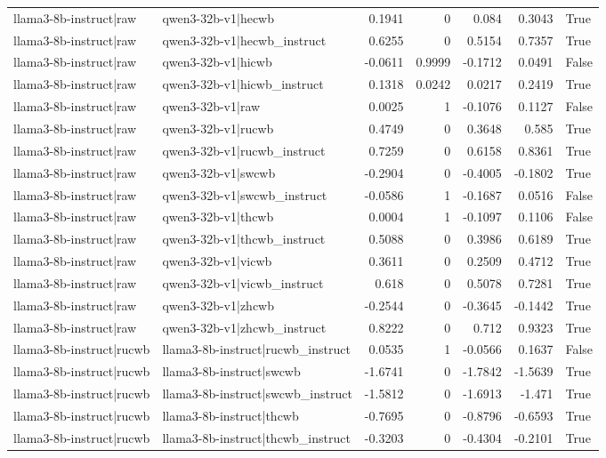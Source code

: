 \begin{table}
\begin{tabular}{l l r r r r l}
llama3-8b-instruct|raw & qwen3-32b-v1|hecwb & 0.1941 & 0 & 0.084 & 0.3043 & True \\
llama3-8b-instruct|raw & qwen3-32b-v1|hecwb_instruct & 0.6255 & 0 & 0.5154 & 0.7357 & True \\
llama3-8b-instruct|raw & qwen3-32b-v1|hicwb & -0.0611 & 0.9999 & -0.1712 & 0.0491 & False \\
llama3-8b-instruct|raw & qwen3-32b-v1|hicwb_instruct & 0.1318 & 0.0242 & 0.0217 & 0.2419 & True \\
llama3-8b-instruct|raw & qwen3-32b-v1|raw & 0.0025 & 1 & -0.1076 & 0.1127 & False \\
llama3-8b-instruct|raw & qwen3-32b-v1|rucwb & 0.4749 & 0 & 0.3648 & 0.585 & True \\
llama3-8b-instruct|raw & qwen3-32b-v1|rucwb_instruct & 0.7259 & 0 & 0.6158 & 0.8361 & True \\
llama3-8b-instruct|raw & qwen3-32b-v1|swcwb & -0.2904 & 0 & -0.4005 & -0.1802 & True \\
llama3-8b-instruct|raw & qwen3-32b-v1|swcwb_instruct & -0.0586 & 1 & -0.1687 & 0.0516 & False \\
llama3-8b-instruct|raw & qwen3-32b-v1|thcwb & 0.0004 & 1 & -0.1097 & 0.1106 & False \\
llama3-8b-instruct|raw & qwen3-32b-v1|thcwb_instruct & 0.5088 & 0 & 0.3986 & 0.6189 & True \\
llama3-8b-instruct|raw & qwen3-32b-v1|vicwb & 0.3611 & 0 & 0.2509 & 0.4712 & True \\
llama3-8b-instruct|raw & qwen3-32b-v1|vicwb_instruct & 0.618 & 0 & 0.5078 & 0.7281 & True \\
llama3-8b-instruct|raw & qwen3-32b-v1|zhcwb & -0.2544 & 0 & -0.3645 & -0.1442 & True \\
llama3-8b-instruct|raw & qwen3-32b-v1|zhcwb_instruct & 0.8222 & 0 & 0.712 & 0.9323 & True \\
llama3-8b-instruct|rucwb & llama3-8b-instruct|rucwb_instruct & 0.0535 & 1 & -0.0566 & 0.1637 & False \\
llama3-8b-instruct|rucwb & llama3-8b-instruct|swcwb & -1.6741 & 0 & -1.7842 & -1.5639 & True \\
llama3-8b-instruct|rucwb & llama3-8b-instruct|swcwb_instruct & -1.5812 & 0 & -1.6913 & -1.471 & True \\
llama3-8b-instruct|rucwb & llama3-8b-instruct|thcwb & -0.7695 & 0 & -0.8796 & -0.6593 & True \\
llama3-8b-instruct|rucwb & llama3-8b-instruct|thcwb_instruct & -0.3203 & 0 & -0.4304 & -0.2101 & True \\

\end{tabular}
\end{table}
